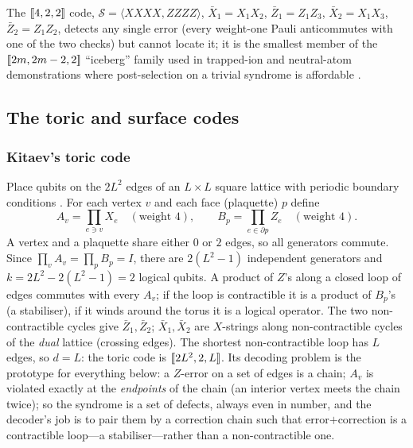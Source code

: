 The $[\![4,2,2]\!]$ code, $\mathcal S=\langle XXXX,ZZZZ\rangle$, $\bar X_1=X_1X_2$, $\bar Z_1=Z_1Z_3$, $\bar X_2=X_1X_3$, $\bar Z_2=Z_1Z_2$, detects any single error (every weight-one Pauli anticommutes with one of the two checks) but cannot locate it; it is the smallest member of the $[\![2m,2m-2,2]\!]$ ``iceberg'' family used in trapped-ion and neutral-atom demonstrations where post-selection on a trivial syndrome is affordable \cite{bluvstein24}.

\subsection{The toric and surface codes}\label{sec:surface}

\subsubsection{Kitaev's toric code}
Place qubits on the $2L^2$ edges of an $L\times L$ square lattice with periodic boundary conditions \cite{kitaev03,dennis02}. For each vertex $v$ and each face (plaquette) $p$ define
\[
A_v=\prod_{e\ni v}X_e\quad(\text{weight }4),\qquad B_p=\prod_{e\in\partial p}Z_e\quad(\text{weight }4).
\]
A vertex and a plaquette share either $0$ or $2$ edges, so all generators commute. Since $\prod_vA_v=\prod_pB_p=I$, there are $2(L^2-1)$ independent generators and $k=2L^2-2(L^2-1)=2$ logical qubits. A product of $Z$'s along a closed loop of edges commutes with every $A_v$; if the loop is contractible it is a product of $B_p$'s (a stabiliser), if it winds around the torus it is a logical operator. The two non-contractible cycles give $\bar Z_1,\bar Z_2$; $\bar X_1,\bar X_2$ are $X$-strings along non-contractible cycles of the \emph{dual} lattice (crossing edges). The shortest non-contractible loop has $L$ edges, so $d=L$: the toric code is $[\![2L^2,2,L]\!]$. Its decoding problem is the prototype for everything below: a $Z$-error on a set of edges is a chain; $A_v$ is violated exactly at the \emph{endpoints} of the chain (an interior vertex meets the chain twice); so the syndrome is a set of defects, always even in number, and the decoder's job is to pair them by a correction chain such that error$+$correction is a contractible loop---a stabiliser---rather than a non-contractible one.

